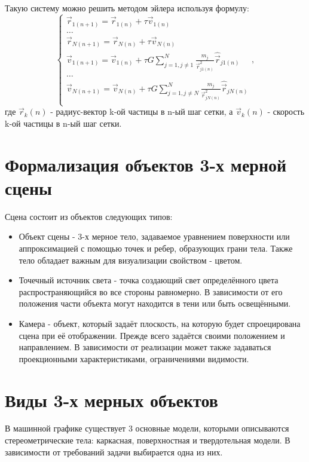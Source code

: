 Такую систему можно решить методом эйлера используя формулу:
\begin{equation}
	\label{n_euler_velocities}
	\begin{cases}
		\vec{r}_{1(n+1)} = \vec{r}_{1(n)} + \tau \vec{v}_{1(n)} \\
		\dots \\
		\vec{r}_{N(n+1)} = \vec{r}_{N(n)} + \tau \vec{v}_{N(n)} \\
		
		
		\vec{v}_{1(n+1)} = \vec{v}_{1(n)} + \tau G\sum_{j=1, j \neq 1}^{N}{\frac{m_j}{\vec{r}_{j1(n)}^2}\hat{\vec{r}}_{j1(n)}} \\
		\dots \\
		\vec{v}_{N(n+1)} = \vec{v}_{N(n)} + \tau G\sum_{j=1, j \neq N}^{N}{\frac{m_j}{\vec{r}_{jN(n)}^2}\hat{\vec{r}}_{jN(n)}} \\
	\end{cases},
\end{equation}
где $\vec{r}_k(n)$ - радиус-вектор k-ой частицы в n-ый шаг сетки, а $\vec{v}_k(n)$ - скорость k-ой частицы в n-ый шаг сетки.


\section{Формализация объектов 3-х мерной сцены}

Сцена состоит из объектов следующих типов:
\begin{itemize}
	\item Объект сцены - 3-х мерное тело, задаваемое уравнением поверхности или аппроксимацией с помощью точек и ребер, образующих грани тела. Также тело обладает важным для визуализации свойством - цветом.
	\item Точечный источник света - точка создающий свет определённого цвета распространяющийся во все стороны равномерно. В зависимости от его положения части объекта могут находится в тени или быть освещёнными.
	\item Камера - объект, который задаёт плоскость, на которую будет спроецирована сцена при её отображении. Прежде всего задаётся своими положением и направлением. В зависимости от реализации может также задаваться проекционными характеристиками, ограничениями видимости.
\end{itemize}

\section{Виды 3-х мерных объектов}
В машинной графике существует 3 основные модели, которыми описываются стереометрические тела: каркасная, поверхностная и твердотельная модели. В зависимости от требований задачи выбирается одна из них.

